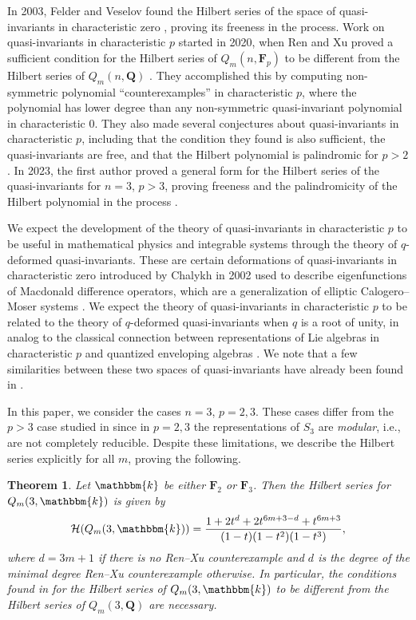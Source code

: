 \documentclass[pdftex]{sigma}
\newtheorem{Theorem}{Theorem}[section]
\theoremstyle{definition}
\numberwithin{equation}{section}
\renewcommand{\k}{\mathbbm{k}}
\begin{document}
In 2003, Felder and Veselov found the Hilbert series of the space of quasi-invariants in characteristic zero \cite{felder2001action}, proving its freeness in the process. Work on quasi-invariants in characteristic $p$ started in 2020, when Ren and Xu proved a sufficient condition for the Hilbert series of $Q_m(n,\mathbf{F}_p)$ to be different from the Hilbert series of $Q_m(n,\mathbf{Q})$ \cite{Ren_2020}. They accomplished this by computing non-symmetric polynomial ``counterexamples'' in characteristic $p$, where the polynomial has lower degree than any non-symmetric quasi-invariant polynomial in characteristic 0. They also made several conjectures about quasi-invariants in characteristic $p$, including that the condition they found is also sufficient, the quasi-invariants are free, and that the Hilbert polynomial is palindromic for $p>2$. In 2023, the first author proved a general form for the Hilbert series of the quasi-invariants for $n=3$, $p>3$, proving freeness and the palindromicity of the Hilbert polynomial in the process \cite{wang2022explicit}.

We expect the development of the theory of quasi-invariants in characteristic $p$ to be useful in mathematical physics and integrable systems through the theory of $q$-deformed quasi-invariants. These are certain deformations of quasi-invariants in characteristic zero introduced by Chalykh in 2002 \cite{CHALYKH2002193} used to describe eigenfunctions of Macdonald difference operators, which are a generalization of elliptic Calogero--Moser systems \cite{ruij}. We expect the theory of quasi-invariants in characteristic $p$ to be related to the theory of $q$-deformed quasi-invariants when $q$ is a root of unity, in analog to the classical connection between representations of Lie algebras in characteristic $p$ and quantized enveloping algebras \cite{ajs}. We note that a few similarities between these two spaces of quasi-invariants have already been found in \cite{wang2022explicit}.

In this paper, we consider the cases $n=3$, $p=2,3$. These cases differ from the $p>3$ case studied in \cite{wang2022explicit} since in $p=2,3$ the representations of $S_3$ are \emph{modular}, i.e., are not completely reducible. Despite these limitations, we describe the Hilbert series explicitly for all $m$, proving the following.

\begin{Theorem}\label{thm:1}
 Let $\k$ be either $\mathbf{F}_2$ or $\mathbf{F}_3$. Then the Hilbert series for $Q_m(3,\k)$ is given by
 \[\mathcal{H}(Q_m(3,\k))=\frac{1+2t^d+2t^{6m+3-d}+t^{6m+3}}{(1-t)(1-t^2)(1-t^3)},\]
 where $d=3m+1$ if there is no Ren--Xu counterexample and $d$ is the degree of the minimal degree Ren--Xu counterexample otherwise. In particular, the conditions found in {\rm \cite{Ren_2020}} for the Hilbert series of $Q_m(3,\k)$ to be different from the Hilbert series of $Q_m(3,\mathbf{Q})$ are necessary.
\end{Theorem}
\end{document}

